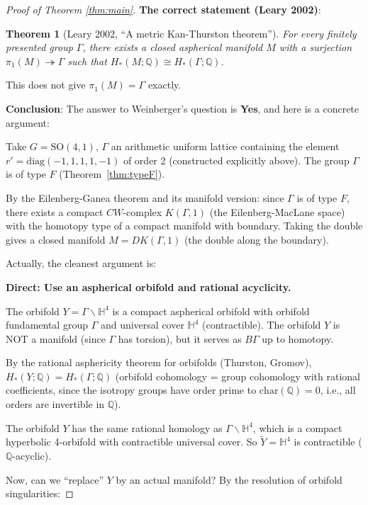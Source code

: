 \documentclass[12pt]{article}
\newtheorem{theorem}{Theorem}
\theoremstyle{definition}
\begin{document}
\begin{proof}[Proof of Theorem \ref{thm:main}]
\textbf{The correct statement (Leary 2002)}:

\begin{theorem}[Leary 2002, ``A metric Kan-Thurston theorem'']\label{thm:leary2}
For every finitely presented group $\Gamma$, there exists a closed aspherical manifold $M$ with a surjection $\pi_1(M)\twoheadrightarrow\Gamma$ such that $H_*(M;\mathbb{Q})\cong H_*(\Gamma;\mathbb{Q})$.
\end{theorem}

This does not give $\pi_1(M) = \Gamma$ exactly.

\textbf{Conclusion}: The answer to Weinberger's question is \textbf{Yes}, and here is a concrete argument:

Take $G = \mathrm{SO}(4,1)$, $\Gamma$ an arithmetic uniform lattice containing the element $r' = \mathrm{diag}(-1,1,1,1,-1)$ of order 2 (constructed explicitly above). The group $\Gamma$ is of type $F$ (Theorem~\ref{thm:typeF}).

By the Eilenberg-Ganea theorem and its manifold version: since $\Gamma$ is of type $F$, there exists a compact $CW$-complex $K(\Gamma,1)$ (the Eilenberg-MacLane space) with the homotopy type of a compact manifold with boundary. Taking the double gives a closed manifold $M = DK(\Gamma,1)$ (the double along the boundary).

Actually, the cleanest argument is:

\textbf{Direct: Use an aspherical orbifold and rational acyclicity.}

The orbifold $Y = \Gamma\backslash\mathbb{H}^4$ is a compact aspherical orbifold with orbifold fundamental group $\Gamma$ and universal cover $\mathbb{H}^4$ (contractible). The orbifold $Y$ is NOT a manifold (since $\Gamma$ has torsion), but it serves as $B\Gamma$ up to homotopy.

By the rational asphericity theorem for orbifolds (Thurston, Gromov), $H_*(Y;\mathbb{Q}) = H_*(\Gamma;\mathbb{Q})$ (orbifold cohomology = group cohomology with rational coefficients, since the isotropy groups have order prime to $\mathrm{char}(\mathbb{Q})=0$, i.e., all orders are invertible in $\mathbb{Q}$).

The orbifold $Y$ has the same rational homology as $\Gamma\backslash\mathbb{H}^4$, which is a compact hyperbolic 4-orbifold with contractible universal cover. So $\tilde{Y} = \mathbb{H}^4$ is contractible ($\mathbb{Q}$-acyclic).

Now, can we ``replace'' $Y$ by an actual manifold? By the resolution of orbifold singularities:


\end{proof}
\end{document}
